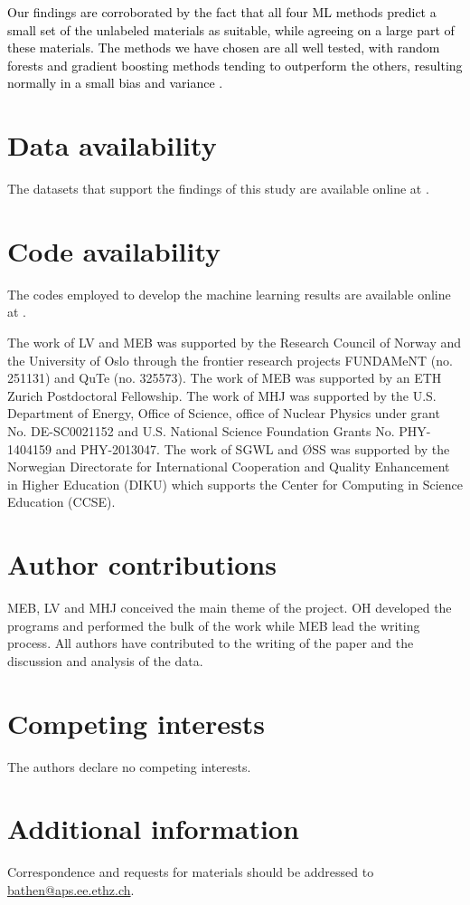\documentclass[superscriptaddress,unsortedaddress,
 amsmath,amssymb,
 aps,
]{revtex4-2}
\newcommand{\mrk}[1]{\textcolor{black}{#1}}
\begin{document}
\mrk{Our findings are corroborated by the fact that all four ML methods predict a small set of the unlabeled materials as suitable, while agreeing on a large part of these materials. 
The methods we have chosen are all well tested, with random forests and gradient boosting methods tending to outperform the others, resulting normally in a small bias and variance \cite{Hastie2009,Mehta2019,Murphy2012}.}

\section*{Data availability} 
The datasets that support the findings of this study are available online at \cite{Ohebbi2021}.

\section*{Code availability} 
The codes employed to develop the machine learning results are available online at \cite{Ohebbi2021}. 



\begin{acknowledgments}

The work of LV and MEB was supported by the Research Council of Norway and the University of Oslo through the frontier research projects FUNDAMeNT (no. 251131) and QuTe (no. 325573). 
The work of MEB was supported by an ETH Zurich Postdoctoral Fellowship. 
The work of MHJ was supported by the U.S. Department of Energy, 
Office of Science, office of Nuclear Physics under grant 
No. DE-SC0021152 and U.S. National Science Foundation Grants
No. PHY-1404159 and PHY-2013047. 
The work of SGWL and ØSS was supported by the Norwegian Directorate for International Cooperation and Quality Enhancement in Higher Education (DIKU) which supports the Center for Computing in Science Education (CCSE).


\end{acknowledgments}

\section*{Author contributions}
MEB, LV and MHJ conceived the main theme of the project. OH developed the programs and performed the bulk of the work while MEB lead the writing process. All authors have contributed to the writing of the paper and the discussion and analysis of the data.

\section*{Competing interests}
The authors declare no competing interests.

\section*{Additional information}
Correspondence and requests for materials should be addressed to \url{bathen@aps.ee.ethz.ch}. 
\end{document}
